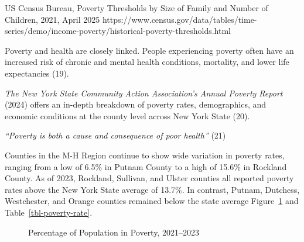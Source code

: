 \documentclass[
  english,
  letterpaper,
]{report}
\begin{document}
\begin{tcolorbox}[enhanced jigsaw, breakable, leftrule=.75mm, title=\textcolor{quarto-callout-note-color}{\faInfo}\hspace{0.5em}{Source}, bottomrule=.15mm, opacityback=0, left=2mm, colback=white, bottomtitle=1mm, coltitle=black, colbacktitle=quarto-callout-note-color!10!white, colframe=quarto-callout-note-color-frame, opacitybacktitle=0.6, toptitle=1mm, titlerule=0mm, arc=.35mm, rightrule=.15mm, toprule=.15mm]

US Census Bureau, Poverty Thresholds by Size of Family and Number of
Children, 2021, April 2025
https://www.census.gov/data/tables/time-series/demo/income-poverty/historical-poverty-thresholds.html

\end{tcolorbox}

Poverty and health are closely linked. People experiencing poverty often
have an increased risk of chronic and mental health conditions,
mortality, and lower life expectancies (19).

\emph{The New York State Community Action Association's Annual Poverty
Report} (2024) offers an in-depth breakdown of poverty rates,
demographics, and economic conditions at the county level across New
York State (20).

\emph{``Poverty is both a cause and consequence of poor health''} (21)

Counties in the M-H Region continue to show wide variation in poverty
rates, ranging from a low of 6.5\% in Putnam County to a high of 15.6\%
in Rockland County. As of 2023, Rockland, Sullivan, and Ulster counties
all reported poverty rates above the New York State average of 13.7\%.
In contrast, Putnam, Dutchess, Westchester, and Orange counties remained
below the state average Figure~\ref{fig-poverty-rate} and
Table~\ref{tbl-poverty-rate}.

\begin{figure}


\caption{\label{fig-poverty-rate}Percentage of Population in Poverty,
2021--2023}

\end{figure}%
\end{document}
